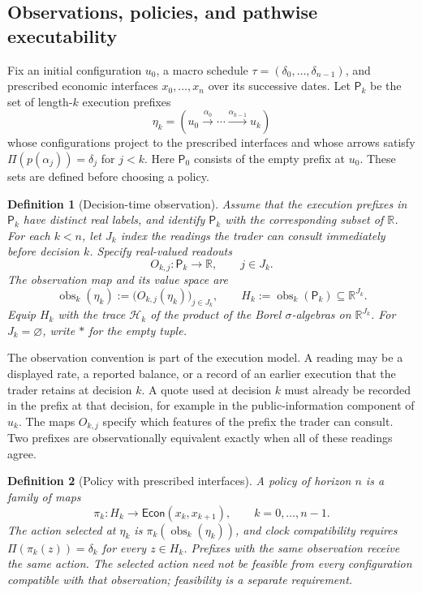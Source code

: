\documentclass[11pt,a4paper]{article}
\newtheorem{definition}{Definition}[section]
\newcommand{\Econ}{\mathsf{Econ}}
\begin{document}
\subsection{Observations, policies, and pathwise executability}
\label{sec:ObservationsPolicies}

Fix an initial configuration $u_0$, a macro schedule
$\tau=(\delta_0,\ldots,\delta_{n-1})$, and prescribed economic interfaces
$x_0,\ldots,x_n$ over its successive dates. Let $\mathsf P_k$ be the set
of length-$k$ execution prefixes
\[
  \eta_k=(u_0\xrightarrow{\alpha_0}\cdots
                   \xrightarrow{\alpha_{k-1}}u_k)
\]
whose configurations project to the prescribed interfaces and whose
arrows satisfy $\Pi(p(\alpha_j))=\delta_j$ for $j<k$.
Here $\mathsf P_0$ consists of the empty prefix at $u_0$.
These sets are defined before choosing a policy.

\begin{definition}[Decision-time observation]
Assume that the execution prefixes in $\mathsf P_k$ have distinct
real labels, and identify $\mathsf P_k$ with the corresponding subset
of $\mathbb R$. For each $k<n$, let $J_k$ index the readings the trader
can consult immediately before decision $k$. Specify real-valued readouts
\[
  O_{k,j}:\mathsf P_k\longrightarrow\mathbb R,
  \qquad j\in J_k.
\]
The observation map and its value space are
\[
  \operatorname{obs}_k(\eta_k)
  :=\bigl(O_{k,j}(\eta_k)\bigr)_{j\in J_k},
  \qquad
  H_k:=\operatorname{obs}_k(\mathsf P_k)
       \subseteq\mathbb R^{J_k}.
\]
Equip $H_k$ with the trace $\mathcal H_k$ of the product of the Borel
$\sigma$-algebras on $\mathbb R^{J_k}$. For $J_k=\varnothing$, write $*$
for the empty tuple.
\end{definition}

The observation convention is part of the execution model. A reading
may be a displayed rate, a reported balance, or a record of an earlier
execution that the trader retains at decision $k$. A quote used at
decision $k$ must already be recorded in the prefix at that decision,
for example in the public-information component of $u_k$. The maps
$O_{k,j}$ specify which features of the prefix the trader can consult.
Two prefixes are observationally equivalent exactly when all of these
readings agree.

\begin{definition}[Policy with prescribed interfaces]
A policy of horizon $n$ is a family of maps
\[
  \pi_k:H_k\longrightarrow\Econ(x_k,x_{k+1}),
  \qquad k=0,\ldots,n-1.
\]
The action selected at $\eta_k$ is
$\pi_k(\operatorname{obs}_k(\eta_k))$, and clock compatibility requires
$\Pi(\pi_k(z))=\delta_k$ for every $z\in H_k$.
Prefixes with the same observation receive the same action.
The selected action need not be feasible from every configuration
compatible with that observation; feasibility is a separate
requirement.
\end{definition}
\end{document}
